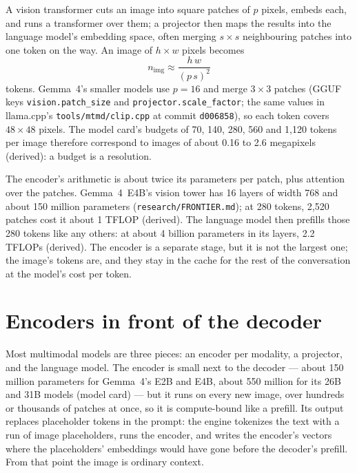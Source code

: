 
A vision transformer cuts an image into square patches of $p$ pixels, embeds
each, and runs a transformer over them; a projector then maps the results into
the language model's embedding space, often merging $s \times s$ neighbouring
patches into one token on the way. An image of $h \times w$ pixels becomes
\begin{equation}
n_{\text{img}} \approx \frac{h\,w}{(p\,s)^{2}}
\label{eq:image-tokens}
\end{equation}
tokens. Gemma~4's smaller models use $p = 16$ and merge $3 \times 3$ patches
(GGUF keys \texttt{vision.patch\_size} and \texttt{projector.scale\_factor}; the
same values in llama.cpp's \texttt{tools/mtmd/clip.cpp} at commit
\texttt{d006858}), so each token covers $48 \times 48$ pixels. The model card's
budgets of 70, 140, 280, 560 and 1,120 tokens per image therefore correspond to
images of about 0.16 to 2.6 megapixels (derived): a budget is a resolution.

The encoder's arithmetic is about twice its parameters per patch, plus
attention over the patches. Gemma~4~E4B's vision tower has 16 layers of width
768 and about 150 million parameters (\texttt{research/FRONTIER.md}); at 280
tokens, 2,520 patches cost it about 1 TFLOP (derived). The language model then
prefills those 280 tokens like any others: at about 4 billion parameters in its
layers, 2.2 TFLOPs (derived). The encoder is a separate stage, but it is not
the largest one; the image's tokens are, and they stay in the cache for the
rest of the conversation at the model's cost per token.

\section{Encoders in front of the decoder}

Most multimodal models are three pieces: an encoder per modality, a projector,
and the language model. The encoder is small next to the decoder --- about 150
million parameters for Gemma~4's E2B and E4B, about 550 million for its 26B and
31B models (model card) --- but it runs on every new image, over hundreds or
thousands of patches at once, so it is compute-bound like a prefill. Its output
replaces placeholder tokens in the prompt: the engine tokenizes the text with a
run of image placeholders, runs the encoder, and writes the encoder's vectors
where the placeholders' embeddings would have gone before the decoder's
prefill. From that point the image is ordinary context.

